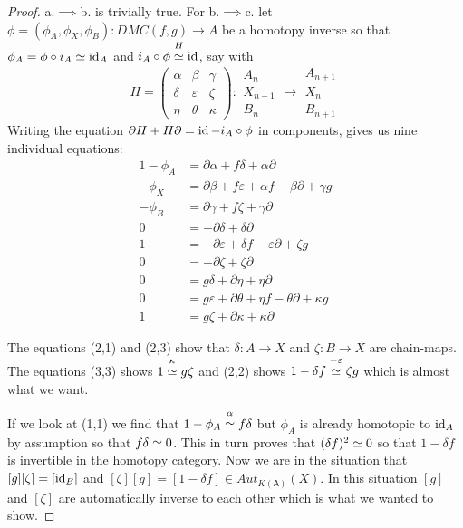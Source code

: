 \documentclass[fontsize=11pt,fleqn,a4paper]{scrartcl}
\begin{document}
\begin{proof}
a.$\implies$b. is trivially true. For b.$\implies$c. let $\phi=(\phi_A,\phi_X,\phi_B): DMC(f,g)\to A$ be a homotopy inverse so that $\phi_A = \phi\circ i_A \overset{}{\simeq} \operatorname{id}_A$ and $i_A \circ \phi \overset{H}{\overset{}{\simeq}} \operatorname{id}$, say with
\[H=\begin{pmatrix}\alpha&\beta&\gamma\\\delta&\varepsilon&\zeta\\\eta&\theta&\kappa\end{pmatrix} : \begin{array}{c}A_n\\X_{n-1}\\B_n\end{array} \to \begin{array}{c}A_{n+1}\\X_n\\B_{n+1}\end{array}\]
Writing the equation $\partial H + H\partial = \operatorname{id} - i_A \circ \phi$ in components, gives us nine individual equations:
\begin{align*}
1-\phi_A &= \partial\alpha+f\delta + \alpha\partial \tag{1,1} \\
-\phi_X &= \partial\beta+f\varepsilon + \alpha f-\beta\partial+\gamma g \tag{1,2} \\
-\phi_B &= \partial\gamma+f\zeta+\gamma\partial \tag{1,3} \\
%
0 &= -\partial\delta +\delta\partial \tag{2,1} \\
1 &= -\partial\varepsilon + \delta f - \varepsilon\partial + \zeta g \tag{2,2} \\
0 &= -\partial\zeta + \zeta\partial \tag{2,3} \\
%
0 &= g\delta + \partial\eta + \eta\partial \tag{3,1} \\
0 &= g\varepsilon + \partial\theta+\eta f - \theta\partial+\kappa g \tag{3,2} \\
1 &= g\zeta +\partial\kappa + \kappa\partial \tag{3,3}
\end{align*}

The equations (2,1) and (2,3) show that $\delta: A\to X$ and $\zeta: B\to X$ are chain-maps. The equations (3,3) shows $1 \overset{\kappa}{\overset{}{\simeq}} g\zeta$ and (2,2) shows $1-\delta f \overset{-\varepsilon}{\overset{}{\simeq}} \zeta g$ which is almost what we want.

If we look at (1,1) we find that $1-\phi_A \overset{\alpha}{\overset{}{\simeq}} f\delta$ but $\phi_A$ is already homotopic to $\operatorname{id}_A$ by assumption so that $f\delta \overset{}{\simeq} 0$. This in turn proves that $(\delta f)^2 \overset{}{\simeq} 0$ so that $1-\delta f$ is invertible in the homotopy category. Now we are in the situation that $[g][\zeta] = [\operatorname{id}_B]$ and $[\zeta][g]=[1-\delta f]\in Aut_{K(\mathsf{A})}(X)$. In this situation $[g]$ and $[\zeta]$ are automatically inverse to each other which is what we wanted to show.


\end{proof}
\end{document}
